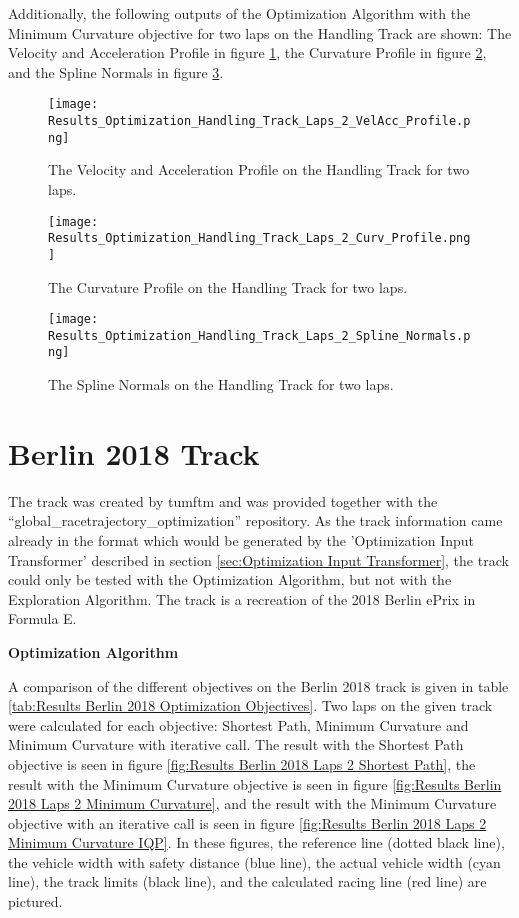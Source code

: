 Additionally, the following outputs of the Optimization Algorithm with the Minimum Curvature objective for two laps on the Handling Track are shown: The Velocity and Acceleration Profile in figure \ref{fig:Results Handling Track Laps 2 VelAcc Profile}, the Curvature Profile in figure \ref{fig:Results Handling Track Laps 2 Curv Profile}, and the Spline Normals in figure \ref{fig:Results Handling Track Laps 2 Spline Normals}.
\begin{figure}[H]
    \centering
    \texttt{[image: Results\_Optimization\_Handling\_Track\_Laps\_2\_VelAcc\_Profile.png]}
    \caption{The Velocity and Acceleration Profile on the Handling Track for two laps.}
    \label{fig:Results Handling Track Laps 2 VelAcc Profile}
\end{figure}
\begin{figure}[H]
    \centering
    \texttt{[image: Results\_Optimization\_Handling\_Track\_Laps\_2\_Curv\_Profile.png]}
    \caption{The Curvature Profile on the Handling Track for two laps.}
    \label{fig:Results Handling Track Laps 2 Curv Profile}
\end{figure}
\begin{figure}[H]
    \centering
    \texttt{[image: Results\_Optimization\_Handling\_Track\_Laps\_2\_Spline\_Normals.png]}
    \caption{The Spline Normals on the Handling Track for two laps.}
    \label{fig:Results Handling Track Laps 2 Spline Normals}
\end{figure}

\section{Berlin 2018 Track} \label{sec:Results Berlin 2018 Track}
The track was created by \acrshort{tumftm} and was provided together with the ``global\_racetrajectory\_optimization'' repository. \cite{tumftm_optimization_algoritm}
As the track information came already in the format which would be generated by the 'Optimization Input Transformer' described in section \ref{sec:Optimization Input Transformer}, the track could only be tested with the Optimization Algorithm, but not with the Exploration Algorithm. The track is a recreation of the 2018 Berlin ePrix in Formula E. \cite{formula_e_berlin_eprix}

\textbf{Optimization Algorithm}

A comparison of the different objectives on the Berlin 2018 track is given in table \ref{tab:Results Berlin 2018 Optimization Objectives}. Two laps on the given track were calculated for each objective: Shortest Path, Minimum Curvature and Minimum Curvature with iterative call. The result with the Shortest Path objective is seen in figure \ref{fig:Results Berlin 2018 Laps 2 Shortest Path}, the result with the Minimum Curvature objective is seen in figure \ref{fig:Results Berlin 2018 Laps 2 Minimum Curvature}, and the result with the Minimum Curvature objective with an iterative call is seen in figure \ref{fig:Results Berlin 2018 Laps 2 Minimum Curvature IQP}. In these figures, the reference line (dotted black line), the vehicle width with safety distance (blue line), the actual vehicle width (cyan line), the track limits (black line), and the calculated racing line (red line) are pictured.

